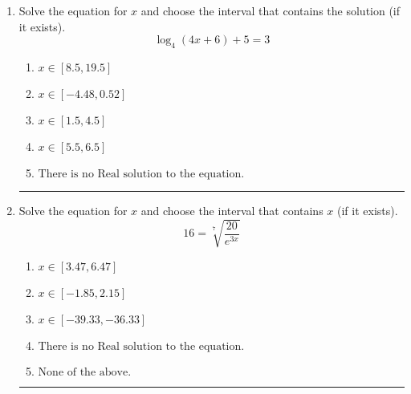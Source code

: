 \documentclass[14pt]{extbook}
\newcommand{\litem}[1]{\item#1\hspace*{-1cm}\rule{\textwidth}{0.4pt}}
\begin{document}
\begin{enumerate}
{\begin{enumerate}[label=\Alph*.]
\end{enumerate} }
\litem{
Solve the equation for $x$ and choose the interval that contains the solution (if it exists).\[ \log_{4}{(4x+6)}+5 = 3 \]\begin{enumerate}[label=\Alph*.]
\item \( x \in [8.5, 19.5] \)
\item \( x \in [-4.48, 0.52] \)
\item \( x \in [1.5, 4.5] \)
\item \( x \in [5.5, 6.5] \)
\item \( \text{There is no Real solution to the equation.} \)

\end{enumerate} }
\litem{
 Solve the equation for $x$ and choose the interval that contains $x$ (if it exists).\[  16 = \sqrt[7]{\frac{20}{e^{3x}}} \]\begin{enumerate}[label=\Alph*.]
\item \( x \in [3.47, 6.47] \)
\item \( x \in [-1.85, 2.15] \)
\item \( x \in [-39.33, -36.33] \)
\item \( \text{There is no Real solution to the equation.} \)
\item \( \text{None of the above.} \)

\end{enumerate} }
\end{enumerate}
\end{document}

